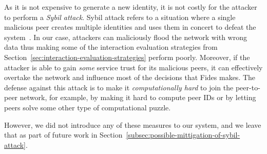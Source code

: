As it is not expensive to generate a new identity, it is not costly for the attacker to perform a \textit{Sybil attack}.
Sybil attack refers to a situation where a single malicious peer creates multiple identities and uses them in concert to defeat the system~\cite{sybil}.
In our case, attackers can maliciously flood the network with wrong data thus making some of the interaction evaluation strategies from Section~\ref{sec:interaction-evaluation-strategies} perform poorly.
Moreover, if the attacker is able to gain \textit{some} service trust for its malicious peers, it can effectively overtake the network and influence most of the decisions that Fides makes.
The defense against this attack is to make it \textit{computationally hard} to join the peer-to-peer network, for example, by making it hard to compute peer IDs or by letting peers solve some other type of computational puzzle. 

However, we did not introduce any of these measures to our system, and we leave that as part of future work in Section~\ref{subsec:possible-mittigation-of-sybil-attack}. 